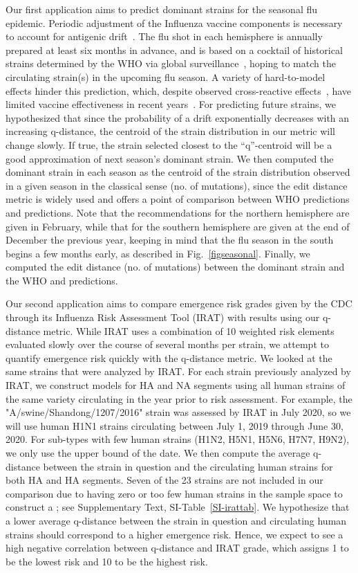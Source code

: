 \documentclass[onecolumn, compsoc,10pt]{IEEEtran}
\begin{document}
Our first application aims to predict dominant strains for the seasonal flu epidemic. Periodic adjustment of the Influenza vaccine components is necessary to account for antigenic drift~\cite{boni2008vaccination,dos2016influenza}. The flu shot in each hemisphere is annually prepared at least six months in advance, and is based on a cocktail of historical strains determined by the WHO via global surveillance~\cite{agor2018models}, hoping to match the circulating strain(s) in the upcoming flu season. A variety of hard-to-model effects hinder this prediction, which, despite observed cross-reactive effects~\cite{tricco2013comparing}, have limited vaccine effectiveness in recent years~\cite{cdceff}. For predicting future strains, we hypothesized that since the probability of a drift exponentially decreases with an increasing q-distance, the centroid of the strain distribution in our metric will change slowly. If true, the strain selected closest to the ``q''-centroid will be a good approximation of next season's dominant strain. We then computed the dominant strain in each season as the centroid of the strain distribution observed in a given season in the classical sense (no. of mutations), since the edit distance metric is widely used and offers a point of comparison between WHO predictions and \qnet predictions. Note that the recommendations for the northern hemisphere are given in February, while that for the southern hemisphere are given at the end of December the previous year, keeping in mind that the flu season in the south begins a few months early, as described in Fig.~\ref{figseasonal}. Finally, we computed the edit distance (no. of mutations) between the dominant strain and the WHO and \qnet predictions.

Our second application aims to compare emergence risk grades given by the CDC through its Influenza Risk Assessment Tool (IRAT) with results using our q-distance metric. While IRAT uses a combination of 10 weighted risk elements evaluated slowly over the course of several months per strain, we attempt to quantify emergence risk quickly with the q-distance metric. We looked at the same strains that were analyzed by IRAT. For each strain previously analyzed by IRAT, we construct \qnet models for HA and NA segments using all human strains of the same variety circulating in the year prior to risk assessment. For example, the "A/swine/Shandong/1207/2016" strain was assessed by IRAT in July 2020, so we will use human H1N1 strains circulating between July 1, 2019 through June 30, 2020. For sub-types with few human strains (H1N2, H5N1, H5N6, H7N7, H9N2), we only use the upper bound of the date. We then compute the average q-distance between the strain in question and the circulating human strains for both HA and HA segments. Seven of the 23 strains are not included in our comparison due to having zero or too few human strains in the sample space to construct a \qnet; see Supplementary Text, SI-Table~\ref{SI-irattab}. We hypothesize that a lower average q-distance between the strain in question and circulating human strains should correspond to a higher emergence risk. Hence, we expect to see a high negative correlation between q-distance and IRAT grade, which assigns 1 to be the lowest risk and 10 to be the highest risk.
\end{document}
